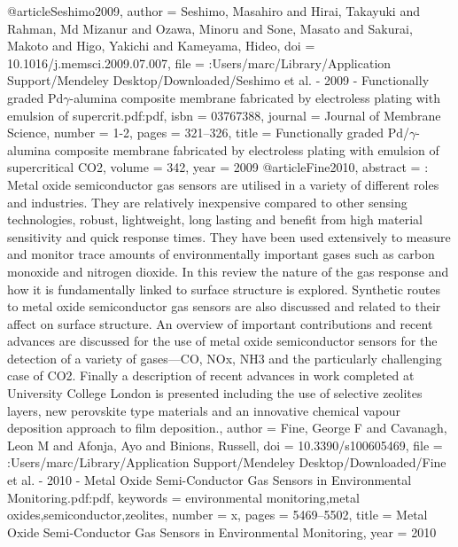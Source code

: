 @article{Seshimo2009,
author = {Seshimo, Masahiro and Hirai, Takayuki and Rahman, Md Mizanur and Ozawa, Minoru and Sone, Masato and Sakurai, Makoto and Higo, Yakichi and Kameyama, Hideo},
doi = {10.1016/j.memsci.2009.07.007},
file = {:Users/marc/Library/Application Support/Mendeley Desktop/Downloaded/Seshimo et al. - 2009 - Functionally graded Pd$\gamma$-alumina composite membrane fabricated by electroless plating with emulsion of supercrit.pdf:pdf},
isbn = {03767388},
journal = {Journal of Membrane Science},
number = {1-2},
pages = {321--326},
title = {{Functionally graded Pd/$\gamma$-alumina composite membrane fabricated by electroless plating with emulsion of supercritical CO2}},
volume = {342},
year = {2009}
}
@article{Fine2010,
abstract = {: Metal oxide semiconductor gas sensors are utilised in a variety of different roles and industries. They are relatively inexpensive compared to other sensing technologies, robust, lightweight, long lasting and benefit from high material sensitivity and quick response times. They have been used extensively to measure and monitor trace amounts of environmentally important gases such as carbon monoxide and nitrogen dioxide. In this review the nature of the gas response and how it is fundamentally linked to surface structure is explored. Synthetic routes to metal oxide semiconductor gas sensors are also discussed and related to their affect on surface structure. An overview of important contributions and recent advances are discussed for the use of metal oxide semiconductor sensors for the detection of a variety of gases—CO, NOx, NH3 and the particularly challenging case of CO2. Finally a description of recent advances in work completed at University College London is presented including the use of selective zeolites layers, new perovskite type materials and an innovative chemical vapour deposition approach to 
film deposition.},
author = {Fine, George F and Cavanagh, Leon M and Afonja, Ayo and Binions, Russell},
doi = {10.3390/s100605469},
file = {:Users/marc/Library/Application Support/Mendeley Desktop/Downloaded/Fine et al. - 2010 - Metal Oxide Semi-Conductor Gas Sensors in Environmental Monitoring.pdf:pdf},
keywords = {environmental monitoring,metal oxides,semiconductor,zeolites},
number = {x},
pages = {5469--5502},
title = {{Metal Oxide Semi-Conductor Gas Sensors in Environmental Monitoring}},
year = {2010}
}
